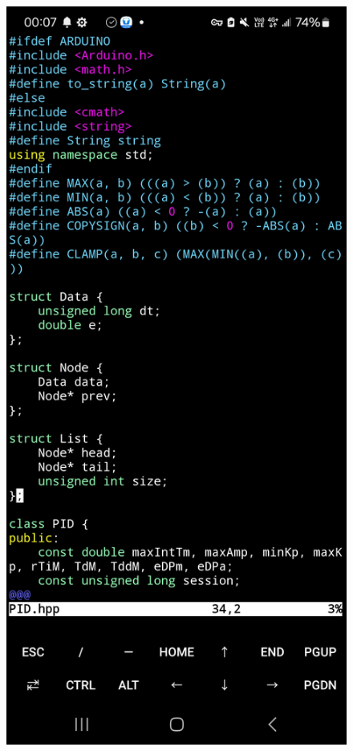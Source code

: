 \documentclass[a4paper,12pt]{article}
\begin{document}
\begin{center}\begin{figure}[H]\centering
\hfill
\begin{minipage}[t]{0.45\textwidth}
\centering
\includegraphics[width=\textwidth]{./working_screenshots/5.jpg}

\end{minipage}
\end{figure}
\end{center}
\end{document}
